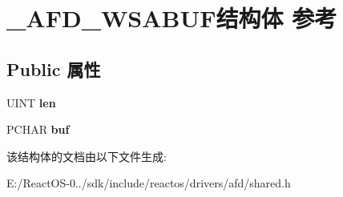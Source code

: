 \hypertarget{struct___a_f_d___w_s_a_b_u_f}{}\section{\+\_\+\+A\+F\+D\+\_\+\+W\+S\+A\+B\+U\+F结构体 参考}
\label{struct___a_f_d___w_s_a_b_u_f}
\subsection*{Public 属性}
\begin{DoxyCompactItemize}
\item 
\mbox{\label{struct___a_f_d___w_s_a_b_u_f_a9d317663f7f8486a18ac0b5b3370eae0}} 
U\+I\+NT {\bfseries len}
\item 
\mbox{\label{struct___a_f_d___w_s_a_b_u_f_a33e939358c913630da8c597ad7b6130b}} 
P\+C\+H\+AR {\bfseries buf}
\end{DoxyCompactItemize}


该结构体的文档由以下文件生成\+:\begin{DoxyCompactItemize}
\item 
E\+:/\+React\+O\+S-\/0../sdk/include/reactos/drivers/afd/shared.\+h\end{DoxyCompactItemize}
